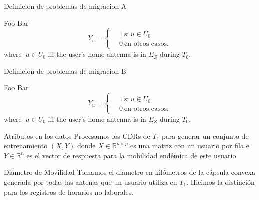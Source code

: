 \documentclass[xcolor=x11names]{beamer}
\begin{document}
\begin{frame}{Definicion de problemas de migracion A}
			\begin{block}{Foo}
			Bar
			\[
			Y_u =
			\begin{cases}
			&1 \ \mbox{si} \ u \in U_0  \\
			&0 \ \mbox{en otros casos}.
			\end{cases}
			\]
			where $\ u \in U_0$ iff the user's home antenna is in $E_Z$ during $T_0$.
			\end{block}

\end{frame}


\begin{frame}{Definicion de problemas de migracion B}
			\begin{block}{Foo}
			Bar
			\[
			Y_u =
			\begin{cases}
			&1 \ \mbox{si} \ u \in U_0  \\
			&0 \ \mbox{en otros casos}.
			\end{cases}
			\]
			where $\ u \in U_0$ iff the user's home antenna is in $E_Z$ during $T_0$.
			\end{block}

\end{frame}


\begin{frame}{Atributos en los datos}
	Procesamos los CDRs de $T_1$ para generar un conjunto de entrenamiento $(X,Y)$ donde $X \in \mathbb{R}^{n \times p}$ es una matriz con un usuario por fila e $Y \in \mathbb{R}^n$ es el vector de respuesta para la mobilidad endémica de este usuario

	\bigskip

	\begin{block}{Diámetro de Movilidad}
		Tomamos el diametro en kilómetros de la cápsula convexa generada por todas las antenas que un usuario utiliza en $T_1$. Hicimos la distinción para los registros de horarios no laborales.
	\end{block}

\end{frame}
\end{document}
